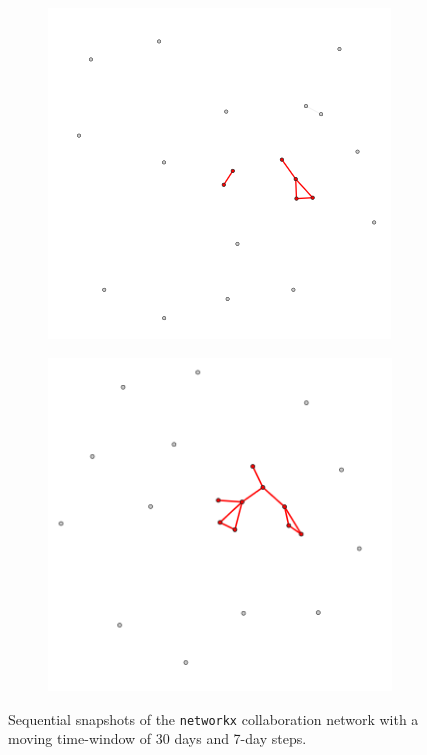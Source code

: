 \begin{figure}
\begin{subfigure}{0.3\textwidth}
        \caption{}
        \label{fig:temporal net D}
    \end{subfigure}
    \hfill
    \begin{subfigure}{0.3\textwidth}
        \centering
        \includegraphics[width=\textwidth]{figures/temporal/4.png}
        \caption{}
        \label{fig:temporal net E}
    \end{subfigure}
    \hfill
    \begin{subfigure}{0.3\textwidth}
        \centering
        \includegraphics[width=\textwidth]{figures/temporal/5.png}
        \caption{}
        \label{fig:temporal net F}
    \end{subfigure}
    \caption{Sequential snapshots of the \texttt{networkx} collaboration network with a moving time-window of 30 days and 7-day steps.}
    \label{fig:temporal net}
\end{figure}


